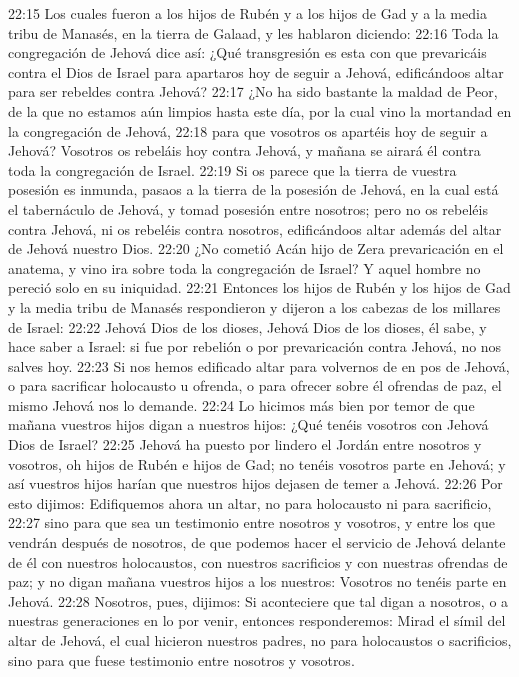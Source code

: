 22:15 Los cuales fueron a los hijos de Rubén y a los hijos de Gad y a la media tribu de Manasés, en la tierra de Galaad, y les hablaron diciendo:  
22:16 Toda la congregación de Jehová dice así: ¿Qué transgresión es esta con que prevaricáis contra el Dios de Israel para apartaros hoy de seguir a Jehová, edificándoos altar para ser rebeldes contra Jehová? 
22:17 ¿No ha sido bastante la maldad de Peor, de la que no estamos aún limpios hasta este día, por la cual vino la mortandad en la congregación de Jehová, 
22:18 para que vosotros os apartéis hoy de seguir a Jehová? Vosotros os rebeláis hoy contra Jehová, y mañana se airará él contra toda la congregación de Israel.  
22:19 Si os parece que la tierra de vuestra posesión es inmunda, pasaos a la tierra de la posesión de Jehová, en la cual está el tabernáculo de Jehová, y tomad posesión entre nosotros; pero no os rebeléis contra Jehová, ni os rebeléis contra nosotros, edificándoos altar además del altar de Jehová nuestro Dios.  
22:20 ¿No cometió Acán hijo de Zera prevaricación en el anatema, y vino ira sobre toda la congregación de Israel? Y aquel hombre no pereció solo en su iniquidad. 
22:21 Entonces los hijos de Rubén y los hijos de Gad y la media tribu de Manasés respondieron y dijeron a los cabezas de los millares de Israel:  
22:22 Jehová Dios de los dioses, Jehová Dios de los dioses, él sabe, y hace saber a Israel: si fue por rebelión o por prevaricación contra Jehová, no nos salves hoy.  
22:23 Si nos hemos edificado altar para volvernos de en pos de Jehová, o para sacrificar holocausto u ofrenda, o para ofrecer sobre él ofrendas de paz, el mismo Jehová nos lo demande.  
22:24 Lo hicimos más bien por temor de que mañana vuestros hijos digan a nuestros hijos: ¿Qué tenéis vosotros con Jehová Dios de Israel?  
22:25 Jehová ha puesto por lindero el Jordán entre nosotros y vosotros, oh hijos de Rubén e hijos de Gad; no tenéis vosotros parte en Jehová; y así vuestros hijos harían que nuestros hijos dejasen de temer a Jehová.  
22:26 Por esto dijimos: Edifiquemos ahora un altar, no para holocausto ni para sacrificio,  
22:27 sino para que sea un testimonio entre nosotros y vosotros, y entre los que vendrán después de nosotros, de que podemos hacer el servicio de Jehová delante de él con nuestros holocaustos, con nuestros sacrificios y con nuestras ofrendas de paz; y no digan mañana vuestros hijos a los nuestros: Vosotros no tenéis parte en Jehová.  
22:28 Nosotros, pues, dijimos: Si aconteciere que tal digan a nosotros, o a nuestras generaciones en lo por venir, entonces responderemos: Mirad el símil del altar de Jehová, el cual hicieron nuestros padres, no para holocaustos o sacrificios, sino para que fuese testimonio entre nosotros y vosotros.  
